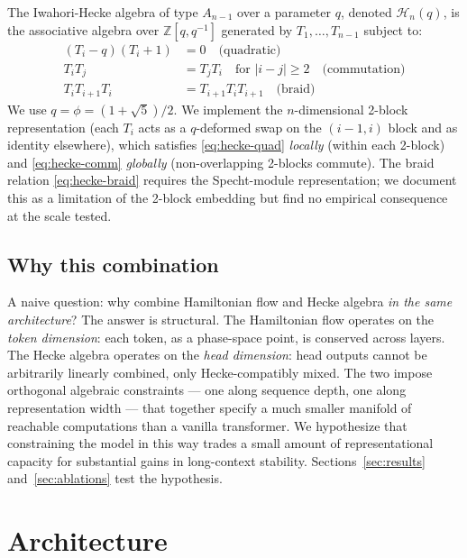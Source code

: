 \documentclass[11pt]{article}
\newcommand{\Z}{\mathbb{Z}}
\newcommand{\phigold}{\phi}
\begin{document}
The Iwahori-Hecke algebra of type $A_{n-1}$ over a parameter $q$, denoted
$\mathcal{H}_n(q)$, is the associative algebra over $\Z[q, q^{-1}]$ generated
by $T_1, \ldots, T_{n-1}$ subject to:
\begin{align}
(T_i - q)(T_i + 1) &= 0 \quad \text{(quadratic)} \label{eq:hecke-quad} \\
T_i T_j &= T_j T_i \quad \text{for } |i - j| \geq 2 \quad \text{(commutation)} \label{eq:hecke-comm} \\
T_i T_{i+1} T_i &= T_{i+1} T_i T_{i+1} \quad \text{(braid)} \label{eq:hecke-braid}
\end{align}
We use $q = \phigold = (1 + \sqrt{5})/2$. We implement the
$n$-dimensional 2-block representation (each $T_i$ acts as a $q$-deformed
swap on the $(i{-}1, i)$ block and as identity elsewhere), which satisfies
\eqref{eq:hecke-quad} \emph{locally} (within each 2-block) and
\eqref{eq:hecke-comm} \emph{globally} (non-overlapping 2-blocks commute).
The braid relation \eqref{eq:hecke-braid} requires the Specht-module
representation; we document this as a limitation of the 2-block embedding
but find no empirical consequence at the scale tested.

\subsection{Why this combination}

A naive question: why combine Hamiltonian flow and Hecke algebra
\emph{in the same architecture}? The answer is structural. The Hamiltonian
flow operates on the \emph{token dimension}: each token, as a phase-space
point, is conserved across layers. The Hecke algebra operates on the
\emph{head dimension}: head outputs cannot be arbitrarily linearly
combined, only Hecke-compatibly mixed. The two impose orthogonal
algebraic constraints --- one along sequence depth, one along
representation width --- that together specify a much smaller manifold
of reachable computations than a vanilla transformer. We hypothesize
that constraining the model in this way trades a small amount of
representational capacity for substantial gains in long-context
stability. Sections~\ref{sec:results} and~\ref{sec:ablations} test the
hypothesis.

\section{Architecture}
\label{sec:method}
\end{document}
